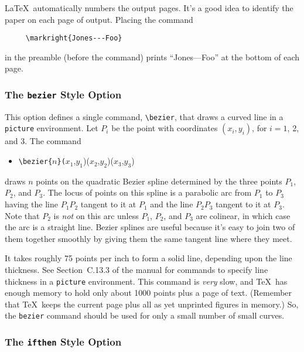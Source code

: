 \LaTeX\ automatically numbers the output pages.  It's a good idea 
to identify the paper on each page of output.  Placing the command
\begin{verbatim}
     \markright{Jones---Foo}
\end{verbatim}
in the preamble (before the \hbox{\verb||} command)
prints ``Jones---Foo'' at the bottom of each page.  
 
\subsubsection{The {\tt bezier} Style Option}
 
This option defines a single command, \hbox{\verb|\bezier|}, that draws
a curved line in a {\tt picture} environment.  Let $P_{i}$ be the point
with coordinates $(x_{i},y_{i})$, for $i=1$, 2, and 3.  The command
\begin{itemize} \tt
\item[]
\verb|\bezier{|$n$\verb|}(|$x_{1}$,$y_{1}$)($x_{2}$,$y_{2}$)($x_{3}$,$y_{3}$)
\end{itemize}
draws $n$ points on the quadratic Bezier spline determined by the three
points $P_{1}$, $P_{2}$, and $P_{3}$.  The locus of points on this
spline is a parabolic arc from $P_{1}$ to $P_{3}$ having the line
$P_{1}P_{2}$ tangent to it at $P_{1}$ and the line $P_{2}P_{3}$ tangent
to it at $P_{3}$.  Note that $P_{2}$ is {\em not\/} on this arc unless
$P_{1}$, $P_{2}$, and $P_{3}$ are colinear, in which case the arc is a
straight line.  Bezier splines are useful because it's easy to join two
of them together smoothly by giving them the same tangent line where
they meet.
 
It takes roughly 75 points per inch to form a solid line, depending
upon the line thickness.  See Section~C.13.3 of the manual for commands
to specify line thickness in a {\tt picture} environment.  This command
is {\em very\/} slow, and \TeX\ has enough memory to hold only about
1000 points plus a page of text.  (Remember that \TeX\ keeps the
current page plus all as yet unprinted figures in memory.) So, the
\verb|bezier| command should be used for only a small number of small
curves.
 
 
\subsubsection{The {\tt ifthen} Style Option}
 
